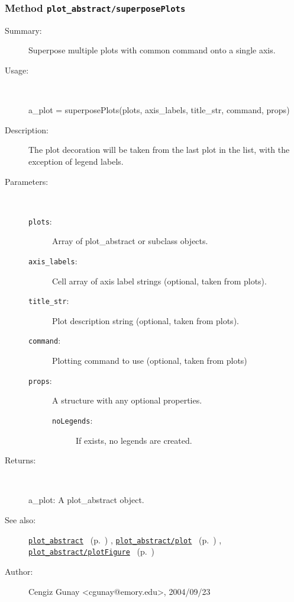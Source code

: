 \subsubsection[Method \texttt{superposePlots}]{Method \texttt{plot\_abstract/superposePlots}}%
%
\label{ref_plot_abstract__superposePlots}%
\hypertarget{ref_plot_abstract__superposePlots}{}%
\begin{description}
\item[Summary:]Superpose multiple plots with common command onto a single axis.
%
\item[Usage:]~%
\begin{lyxcode}%
a\_plot = superposePlots(plots, axis\_labels, title\_str, command, props)
%
\end{lyxcode}%
%
\item[Description:]%
The plot decoration will be taken from the last plot in the list, 
 with the exception of legend labels.
\item[Parameters:]~
\begin{description}%
\item[\texttt{plots}:]
 Array of plot\_abstract or subclass objects.
\item[\texttt{axis\_labels}:]
 Cell array of axis label strings (optional, taken from plots).
\item[\texttt{title\_str}:]
 Plot description string (optional, taken from plots).
\item[\texttt{command}:]
 Plotting command to use (optional, taken from plots)
\item[\texttt{props}:]
 A structure with any optional properties.
\begin{description}%
\item[\texttt{noLegends}:]
 If exists, no legends are created.
\end{description}%
\end{description}%
%
\item[Returns:]~

	a\_plot: A plot\_abstract object.
%
%
\item[See also:]%
\hyperlink{ref_plot_abstract}{\texttt{plot\_abstract}}%
\ (p.~\pageref{ref_plot_abstract})%
%
, \hyperlink{ref_plot_abstract__plot}{\texttt{plot\_abstract/plot}}%
\ (p.~\pageref{ref_plot_abstract__plot})%
%
, \hyperlink{ref_plot_abstract__plotFigure}{\texttt{plot\_abstract/plotFigure}}%
\ (p.~\pageref{ref_plot_abstract__plotFigure})%
%
%
\item[Author:]%
Cengiz Gunay <cgunay@emory.edu>, 2004/09/23%
\end{description}
\methodline%
